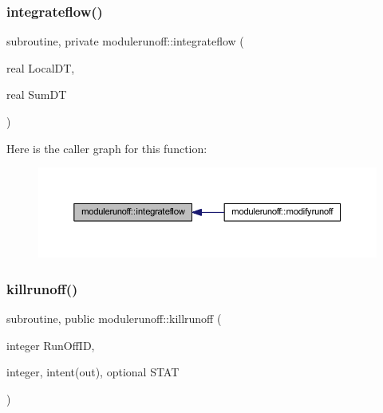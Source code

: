 \subsubsection{\texorpdfstring{integrateflow()}{integrateflow()}}
{\footnotesize\ttfamily subroutine, private modulerunoff\+::integrateflow (\begin{DoxyParamCaption}\item[{real}]{Local\+DT,  }\item[{real}]{Sum\+DT }\end{DoxyParamCaption})\hspace{0.3cm}{\ttfamily [private]}}

Here is the caller graph for this function\+:\nopagebreak
\begin{figure}[H]
\begin{center}
\leavevmode
\includegraphics[width=350pt]{namespacemodulerunoff_ad94c220c4dbba10ee5046785e9e782e9_icgraph}
\end{center}
\end{figure}
\mbox{\label{namespacemodulerunoff_aa17d0391187f304ab3410eb5d26a4711}} 
\subsubsection{\texorpdfstring{killrunoff()}{killrunoff()}}
{\footnotesize\ttfamily subroutine, public modulerunoff\+::killrunoff (\begin{DoxyParamCaption}\item[{integer}]{Run\+Off\+ID,  }\item[{integer, intent(out), optional}]{S\+T\+AT }\end{DoxyParamCaption})}

